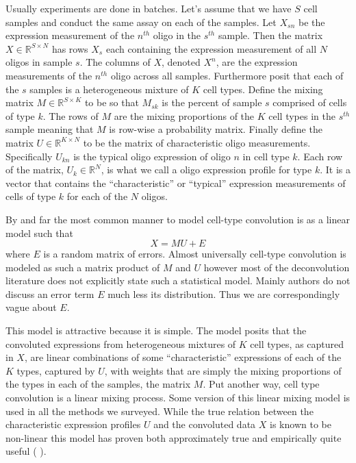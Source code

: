 \documentclass[reqno,12pt,oneside]{report}\usepackage[]{graphicx}\usepackage[]{color}
\renewcommand{\citet}[1]{(\citeauthor{#1} \citeyear{#1})}
\theoremstyle{plain}
\theoremstyle{definition}
\theoremstyle{remark}
\numberwithin{theorem}{chapter}     %
\begin{document}
Usually experiments are done in batches. Let's assume that we have $S$ cell samples and conduct the same assay on each of the samples. Let $X_{sn}$ be the expression measurement of the $n^{th}$ oligo in the $s^{th}$ sample. Then the matrix $X\in \mathbb{R}^{S \times N}$ has rows $X_{s}$ each containing the expression measurement of all $N$ oligos in sample $s$. The columns of $X$, denoted $X^n$, are the expression measurements of the $n^{th}$ oligo across all samples. Furthermore posit that each of the $s$ samples is a heterogeneous mixture of $K$ cell types. Define the mixing matrix $M \in \mathbb{R}^{S \times K}$ to be so that $M_{sk}$ is the percent of sample $s$ comprised of cells of type $k$. The rows of $M$ are the mixing proportions of the $K$ cell types in the $s^{th}$ sample meaning that $M$ is row-wise a probability matrix. Finally define the matrix $U \in \mathbb{R}^{K \times N}$ to be the matrix of characteristic oligo measurements. Specifically $U_{kn}$ is the typical oligo expression of oligo $n$ in cell type $k$. Each row of the matrix, $U_{k}\in\mathbb{R}^{N}$, is what we call a oligo expression profile for type $k$. It is a vector that contains the ``characteristic'' or ``typical'' expression measurements of cells of type $k$ for each of the $N$ oligos.

By and far the most common manner to model cell-type convolution is as a linear model such that
\begin{equation}
  \label{mainmodeqn}
X = MU + E
\end{equation}
where $E$ is a random matrix of errors. Almost universally cell-type convolution is modeled as such a matrix product of $M$ and $U$ however most of the deconvolution literature does not explicitly state such a statistical model. Mainly authors do not discuss an error term $E$ much less its distribution. Thus we are correspondingly vague about $E$. 

This model is attractive because it is simple. The model posits that the convoluted expressions from heterogeneous mixtures of $K$ cell types, as captured in $X$, are linear combinations of some ``characteristic'' expressions of each of the $K$ types, captured by $U$, with weights that are simply the mixing proportions of the types in each of the samples, the matrix $M$. Put another way, cell type convolution is a linear mixing process. Some version of this linear mixing model is used in all the methods we surveyed. While the true relation between the characteristic expression profiles $U$ and the convoluted data $X$ is known to be non-linear this model has proven both approximately true and empirically quite useful \citet{Shen-Orr2010}.
\end{document}
